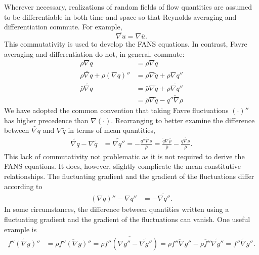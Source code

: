 \documentclass[letterpaper,11pt,nointlimits,reqno,draft]{amsart}
\begin{document}
Wherever necessary, realizations of random fields of flow quantities
are assumed to be differentiable in both time and space so that Reynolds
averaging and differentiation commute.  For example,
%
\begin{equation*}
\overline{ \nabla{}u } = \nabla\bar{u}.
\end{equation*}
%
This commutativity is used to develop the FANS equations.  In contrast, Favre
averaging and differentiation do not, in general, commute:
\begin{align}
  \rho \nabla q &= \rho \nabla q
\\
   \rho \widetilde{\nabla{}q} + \rho \left(\nabla{}q\right)''
&=
   \rho \nabla \tilde{q} + \rho \nabla{}q''
\\
     \bar{\rho} \widetilde{\nabla{}q}
&=
     \bar{\rho} \nabla{\tilde{q}}
   + \overline{\rho \nabla{}q''}
\\
&=
     \bar{\rho} \nabla{\tilde{q}}
   - \overline{q''\nabla\rho}
\end{align}
We have adopted the common convention that taking Favre fluctuations
$\left(\cdot\right)''$ has higher precedence than $\nabla\left(\cdot\right)$.
Rearranging to better examine the difference between $\widetilde{\nabla{}q}$
and $\nabla\tilde{q}$ in terms of mean quantities,
\begin{align}
  \label{eq:favremeancommute}
  \widetilde{\nabla{}q}
  -
  \nabla{\tilde{q}}
&=
  \widetilde{\nabla{}q''}
= - \frac{{\overline{q''\nabla\rho}}}{\bar{\rho}}
= \frac{\tilde{q}\nabla\bar{\rho}}{\bar{\rho}}
  - \frac{\overline{q\nabla\rho}}{\bar{\rho}}
.
\end{align}
This lack of commutativity not problematic as it is not required to derive the
FANS equations.  It does, however, slightly complicate the mean constitutive
relationships.  The fluctuating gradient and the gradient of the fluctuations
differ according to
\begin{align}
  \label{eq:favrefluctcommute}
  \left(\nabla{}q\right)'' - \nabla{}q'' &= - \widetilde{\nabla{}q''}
.
\end{align}
In some circumstances, the difference between quantities written using a
fluctuating gradient and the gradient of the fluctuations can vanish.
One useful example is
\begin{align}
  \label{eq:favrefluctexample}
\widetilde{f''\left(\nabla{}g\right)''}
&=
\overline{\rho{}f''\left(\nabla{}g\right)''}
=
\overline{\rho{}f''\left(\nabla{}g'' - \widetilde{\nabla{}g''}\right)}
=
\overline{\rho{}f''\nabla{}g''}
- \overline{\rho{}f''}\widetilde{\nabla{}g''}
=
\widetilde{f''\nabla{}g''}
.
\end{align}
\end{document}
